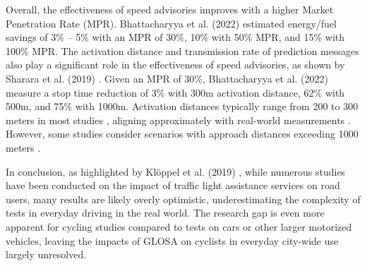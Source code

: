 Overall, the effectiveness of speed advisories improves with a higher Market Penetration Rate (MPR). Bhattacharyya et al. (2022) \cite{bhattacharyya_assessing_2022} estimated energy/fuel savings of 3\% -- 5\% with an MPR of 30\%, 10\% with 50\% MPR, and 15\% with 100\% MPR. The activation distance and transmission rate of prediction messages also play a significant role in the effectiveness of speed advisories, as shown by Sharara et al. (2019) \cite{sharara_impact_2019}. Given an MPR of 30\%, Bhattacharyya et al. (2022) \cite{bhattacharyya_assessing_2022} measure a stop time reduction of 3\% with 300m activation distance, 62\% with 500m, and 75\% with 1000m. Activation distances typically range from 200 to 300 meters in most studies \cite{xia_indirect_2011, raubitschek_predictive_2011, rakha_eco-driving_2011, rakha_aeris_2012, mahler_reducing_2012, tal_vehicular-communications-based_2016, xu_bb_2015, de_nunzio_eco-driving_2015, luo_green_2017, kloeppel_performance_2019, dabiri_optimized_2020, hu_lane-level_2023}, aligning approximately with real-world measurements \cite{bernais_design_2016}. However, some studies consider scenarios with approach distances exceeding 1000 meters \cite{tielert_impact_2010, asadi_predictive_2011, krajzewicz_preparing_2012, nguyen_efficient_2016, karoui_efficiency_2018, plianos_predictive_2018, sharara_impact_2019, simchon_real-time_2020, bhattacharyya_assessing_2022}.

In conclusion, as highlighted by Klöppel et al. (2019) \cite{kloeppel_performance_2019}, while numerous studies have been conducted on the impact of traffic light assistance services on road users, many results are likely overly optimistic, underestimating the complexity of tests in everyday driving in the real world. The research gap is even more apparent for cycling studies compared to tests on cars or other larger motorized vehicles, leaving the impacts of GLOSA on cyclists in everyday city-wide use largely unresolved.

